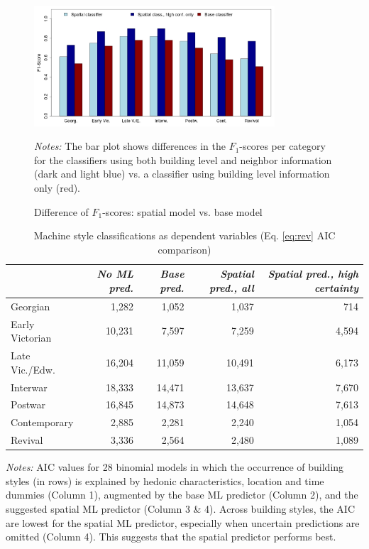 \documentclass[]{article}
\begin{document}
\newpage

\begin{figure}[htb!]
  \caption{Difference of $F_1$-scores: spatial model vs. base model }
  \centering
    \includegraphics[width=0.8\textwidth]{figures/barplot_f1scores.jpg}
  \label{fig:boxplot}
\begin{minipage}{0.7\textwidth}
\vspace{0.25cm}
\footnotesize \emph{Notes:} The bar plot shows differences in the $F_1$-scores per category for the classifiers using both building level and neighbor information (dark and light blue) vs. a classifier using building level information only (red).
\end{minipage}
\end{figure}

\newpage

\begin{table}[htb!]
\caption{Machine style classifications as dependent variables (Eq. \ref{eq:rev} AIC comparison) }
\label{tab:aic}
\centering
\begin{tabular}{lrrrr}
  \toprule
 & \emph{No ML pred.} & \emph{Base pred.} & \emph{Spatial pred., all} & \emph{Spatial pred., high certainty} \\ 
  \midrule
  Georgian & 1,282 & 1,052 & 1,037 & 714 \\ 
  Early Victorian & 10,231 & 7,597 & 7,259 & 4,594 \\ 
  Late Vic./Edw. & 16,204 & 11,059 & 10,491 & 6,173 \\ 
  Interwar & 18,333 & 14,471 & 13,637 & 7,670 \\ 
  Postwar & 16,845 & 14,873 & 14,648 & 7,613 \\ 
  Contemporary & 2,885 & 2,281 & 2,240 & 1,054 \\ 
  Revival & 3,336 & 2,564 & 2,480 & 1,089 \\ 
   \bottomrule
\end{tabular}
\begin{minipage}{0.7\textwidth}
\vspace{0.25cm}
\footnotesize \emph{Notes:}
AIC values for 28 binomial models in which the occurrence of building styles (in rows) is explained by hedonic characteristics, location and time dummies (Column 1), augmented by the base ML predictor (Column 2), and the suggested spatial ML predictor (Column 3 \& 4). Across building styles, the AIC are lowest for the spatial ML predictor, especially when uncertain predictions are omitted (Column 4). This suggests that the spatial predictor performs best.
\end{minipage}
\end{table}
\end{document}
